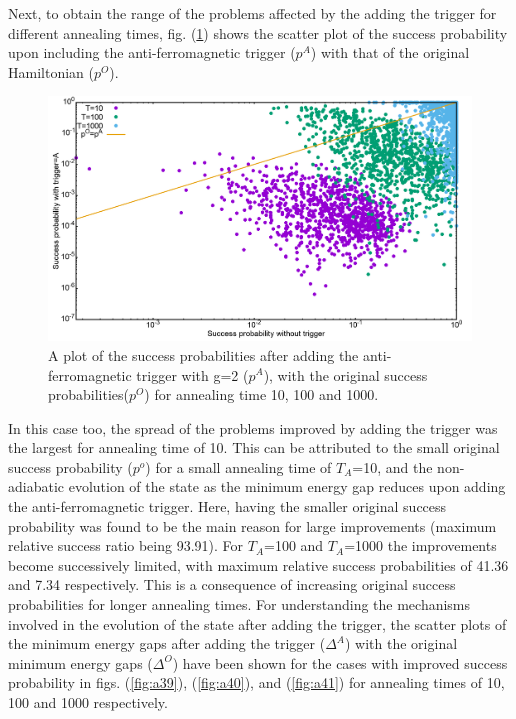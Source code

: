 \documentclass[../main.tex]{subfiles}
\begin{document}
Next, to obtain the range of the problems affected by the adding the trigger for different annealing times, fig. (\ref{fig:a38}) shows the scatter plot of the success probability upon including the anti-ferromagnetic trigger ($p^A$) with that of the original Hamiltonian ($p^O$). 


\begin{figure}[H]
\centering 
\includegraphics[scale=0.3]{ProbScat_g2.png}
\caption{A plot of the success probabilities after adding the anti-ferromagnetic trigger with g=2 ($p^A$), with the original success probabilities($p^O$) for annealing time 10, 100 and 1000.}
\label{fig:a38}
\end{figure}
In this case too, the spread of the problems improved by adding the trigger was the largest for annealing time of 10. This can be attributed to the small original success probability ($p^o$) for a small annealing time of $T_A$=10, and the non-adiabatic evolution of the state as the minimum energy gap reduces upon adding the anti-ferromagnetic trigger. Here, having the smaller original success probability was found to be the main reason for large improvements (maximum relative success ratio being 93.91). For $T_A$=100 and $T_A$=1000 the improvements become successively limited, with maximum relative success probabilities of 41.36 and 7.34 respectively. This is a consequence of increasing original success probabilities for longer annealing times. For understanding the mechanisms involved in the evolution of the state after adding the trigger, the scatter plots of the minimum energy gaps after adding the trigger ($\Delta^A$) with the original minimum energy gaps ($\Delta^O$) have been shown for the cases with improved success probability in figs. (\ref{fig:a39}), (\ref{fig:a40}), and (\ref{fig:a41}) for annealing times of 10, 100 and 1000 respectively.\\
\end{document}
